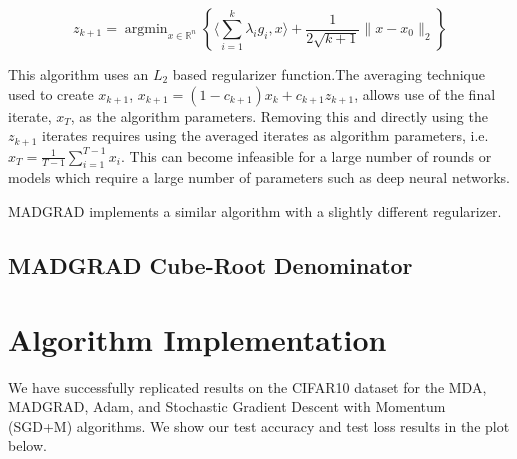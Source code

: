 \documentclass{article}
\newcommand{\R}{\mathbb{R}}
\newcommand{\argmin}{\mathop{\text{argmin}}}
\begin{document}
\[
  z_{k+1} = \argmin_{x \in \R^n}\left\{\langle \sum\limits_{i=1}^{k}\lambda_i g_i, x \rangle + \frac{1}{2\sqrt{k+1}}\|x
  - x_0\|_2\right\}
\]

This algorithm uses an $L_2$ based regularizer function.The averaging technique used to create $x_{k+1}$, $x_{k+1} = (1
- c_{k+1})x_k + c_{k+1}z_{k+1}$, allows use of the final iterate, $x_T$, as the algorithm parameters. Removing this and
directly using the $z_{k+1}$ iterates requires using the averaged iterates as algorithm parameters, i.e. $x_T =
\frac{1}{T-1}\sum_{i=1}^{T-1} x_i$. This can become infeasible for a large number of rounds or models which require a
large number of parameters such as deep neural networks.

MADGRAD implements a similar algorithm with a slightly different regularizer.

\subsection{MADGRAD Cube-Root Denominator}

\section{Algorithm Implementation}

We have successfully replicated results on the CIFAR10 dataset for the MDA, MADGRAD, Adam, and Stochastic
Gradient Descent with Momentum (SGD+M) algorithms. We show our test accuracy and test loss results in the plot below.
\end{document}
